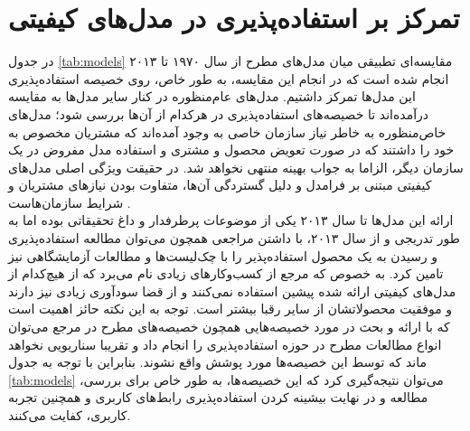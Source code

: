 \section{تمرکز بر استفاده‌پذیری در مدل‌های کیفیتی}
در جدول
\ref{tab:models}
مقایسه‌ای تطبیقی میان مدل‌های مطرح از سال ۱۹۷۰ تا ۲۰۱۳ انجام شده است که در انجام این مقایسه، به طور خاص، روی خصیصه استفاده‌پذیری این مدل‌ها تمرکز داشتیم. مدل‌های عام‌منظوره در کنار سایر مدل‌ها به مقایسه درآمده‌اند تا خصیصه‌های استفاده‌پذیری در هرکدام از آن‌ها بررسی شود؛ مدل‌های خاص‌منظوره به خاطر نیاز سازمان خاصی به وجود آمده‌اند که مشتریان مخصوص به خود را داشتند که در صورت تعویض محصول و مشتری و استفاده مدل مفروض در یک سازمان دیگر، الزاما به جواب بهینه منتهی نخواهد شد. در حقیقت ویژگی اصلی مدل‌های کیفیتی مبتنی بر فرامدل و دلیل گستردگی آن‌ها، متفاوت بودن نیازهای مشتریان و شرایط سازمان‌هاست
\cite{sommerville_software_2016}.\\
ارائه این مدل‌ها تا سال ۲۰۱۳ یکی از موضوعات پرطرفدار و داغ تحقیقاتی بوده اما به طور تدریجی و از سال ۲۰۱۳، با داشتن مراجعی همچون
\cite{albert_measuring_2013}
می‌توان مطالعه استفاده‌پذیری و رسیدن به یک محصول استفاده‌پذیر را با چک‌لیست‌ها و مطالعات آزمایشگاهی نیز تامین کرد. به خصوص که مرجع
\cite{wagner_software_2012}
از کسب‌وکارهای زیادی نام می‌برد که از هیچ‌کدام از مدل‌های کیفیتی ارائه شده پیشین استفاده نمی‌کنند و از قضا سودآوری زیادی نیز دارند و موفقیت محصولاتشان از سایر رقبا بیشتر است. توجه به این نکته حائز اهمیت است که با ارائه و بحث در مورد خصیصه‌هایی همچون خصیصه‌های مطرح در مرجع
\cite{albert_measuring_2013}
می‌توان انواع مطالعات مطرح در حوزه استفاده‌پذیری را انجام داد و تقریبا سناریویی نخواهد ماند که توسط این خصیصه‌ها مورد پوشش واقع نشوند. بنابراین با توجه به جدول
\ref{tab:models}
می‌توان نتیجه‌گیری کرد که این خصیصه‌ها، به طور خاص برای بررسی، مطالعه و در نهایت بیشینه کردن استفاده‌پذیری رابط‌های کاربری و همچنین تجربه کاربری، کفایت می‌کنند.
